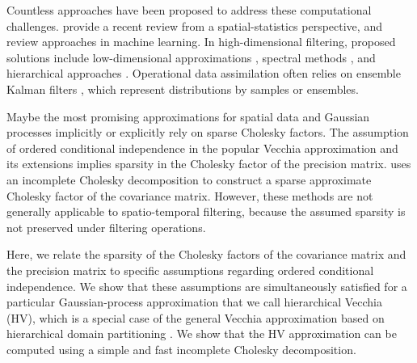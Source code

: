 \documentclass[12pt,letterpaper]{article}
\theoremstyle{propstyle}
\theoremstyle{propstyle}
\theoremstyle{propstyle}
\theoremstyle{propstyle}
\theoremstyle{propstyle}
\begin{document}

Countless approaches have been proposed to address these computational challenges. \citet{Heaton2017} provide a recent review from a spatial-statistics perspective, and \citet{Liu2018} review approaches in machine learning. In  high-dimensional filtering, proposed solutions include low-dimensional approximations \citep[e.g.,][]{Verlaan1995,Pham1998,Wikle1999,Katzfuss2010}, spectral methods \citep[e.g.][]{Wikle1999,Sigrist2015}, and hierarchical approaches \citep[e.g.,][]{Johannesson2003,LiAmbikasaran2014,Saibaba2015,Jurek2018}. Operational data assimilation often relies on ensemble Kalman filters \citep[e.g.,][]{Evensen1994,Burgers1998,Anderson2001,Evensen2007,Katzfuss2015b,Katzfuss2017c}, which represent distributions by samples or ensembles. %

Maybe the most promising approximations for spatial data and Gaussian processes implicitly or explicitly rely on sparse Cholesky factors. The assumption of ordered conditional independence in the popular Vecchia approximation \citep{Vecchia1988} and its extensions \citep[e.g.,][]{Stein2004,Datta2016,Guinness2016a,Katzfuss2017a,Katzfuss2018,Katzfuss2020,Schafer2020} implies sparsity in the Cholesky factor of the precision matrix. \citet{Schafer2017} uses an incomplete Cholesky decomposition to construct a sparse approximate Cholesky factor of the covariance matrix. However, these methods are not generally applicable to spatio-temporal filtering, because the assumed sparsity is not preserved under filtering operations.




Here, we relate the sparsity of the Cholesky factors of the covariance matrix and the precision matrix to specific assumptions regarding ordered conditional independence.
We show that these assumptions are simultaneously satisfied for a particular Gaussian-process approximation that we call hierarchical Vecchia (HV), which is a special case of the general Vecchia approximation \citep{Katzfuss2017a} based on hierarchical domain partitioning \citep[e.g.,][]{Katzfuss2015,Katzfuss2017b}.
We show that the HV approximation can be computed using a simple and fast incomplete Cholesky decomposition.
\end{document}
